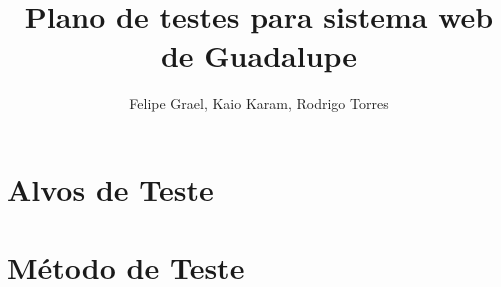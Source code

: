 \documentclass[pdftex,11pt,a4paper]{article}
\title{Plano de testes para sistema web de Guadalupe}
\author{Felipe Grael, Kaio Karam, Rodrigo Torres}
\begin{document}
\maketitle


\section{Alvos de Teste}
\label{sec:alvos}





\section{Método de Teste}
\label{sec:metodo}




\end{document}
